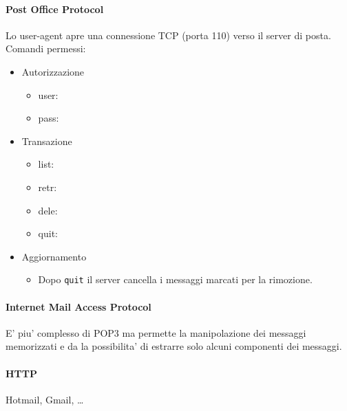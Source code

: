 \paragraph{Post Office Protocol} Lo user-agent apre una connessione TCP (porta 110) verso il server di posta. Comandi permessi:
\begin{itemize}
    \item Autorizzazione
    \begin{itemize}
        \item user:
        \item pass:
    \end{itemize}
    \item Transazione
    \begin{itemize}
        \item list:
        \item retr:
        \item dele:
        \item quit:
    \end{itemize}
    \item Aggiornamento
    \begin{itemize}
        \item Dopo \texttt{quit} il server cancella i messaggi marcati per la rimozione.
    \end{itemize}
\end{itemize}
\paragraph{Internet Mail Access Protocol} E' piu' complesso di POP3 ma permette la manipolazione dei messaggi memorizzati e da la possibilita' di estrarre solo alcuni componenti dei messaggi.
\paragraph{HTTP} Hotmail, Gmail, \dots